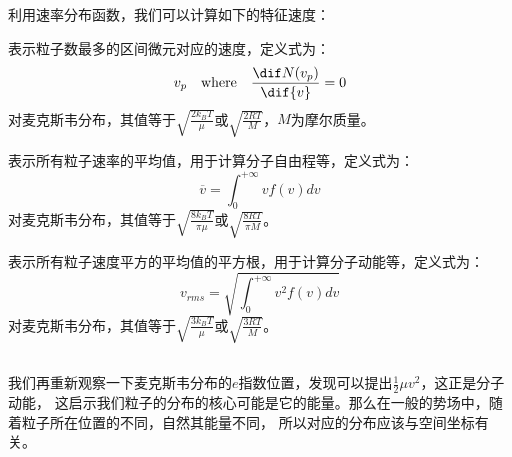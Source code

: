             利用速率分布函数，我们可以计算如下的特征速度：
            \begin{Itemize}
                \item {}表示粒子数最多的区间微元对应的速度，定义式为：
                \begin{equation}
                    v_{p} \quad \text{where} \quad \frac{\dif N({v_{p}})}{\dif{v}} = 0
                    \nonumber
                \end{equation}
                对麦克斯韦分布，其值等于$\sqrt{\frac{2k_{B}T}{\mu}}$或$\sqrt{\frac{2RT}{M}}$，$M$为摩尔质量。
                \item {}表示所有粒子速率的平均值，用于计算分子自由程等，定义式为：
                \begin{equation}
                    \overline{v} = \int_{0}^{+\infty} vf(v)dv
                    \nonumber
                \end{equation}
                对麦克斯韦分布，其值等于$\sqrt{\frac{8k_{B}T}{\pi \mu}}$或$\sqrt{\frac{8RT}{\pi M}}$。
                \item {}表示所有粒子速度平方的平均值的平方根，用于计算分子动能等，定义式为：
                \begin{equation}
                    v_{rms} = \sqrt{\int_{0}^{+\infty} v^{2}f(v)dv}
                    \nonumber
                \end{equation}
                对麦克斯韦分布，其值等于$\sqrt{\frac{3k_{B}T}{\mu}}$或$\sqrt{\frac{3RT}{M}}$。
            \end{Itemize}
        \subsection[玻尔兹曼分布]{}
            我们再重新观察一下麦克斯韦分布的$e$指数位置，发现可以提出$\frac{1}{2}\mu v^{2}$，这正是分子动能，
            这启示我们粒子的分布的核心可能是它的能量。那么在一般的势场中，随着粒子所在位置的不同，自然其能量不同，
            所以对应的分布应该与空间坐标有关。

